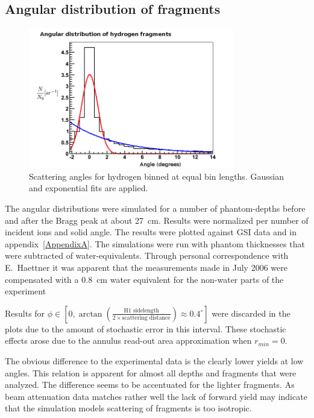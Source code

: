 \subsection{Angular distribution of fragments}
\begin{figure}[!h] 
\begin{center}
\includegraphics[width=0.8\textwidth]{images/plots/angularDistributions/equlBinnedHydrogen279.png}  
\caption{\label{fig:binnedHydrogen} Scattering angles for hydrogen binned at equal bin lengths. Gaussian and exponential fits are applied.}
 \end{center}
 \end{figure}
The angular distributions were simulated for a number of phantom-depths before and after the Bragg peak at about 27~cm. Results were normalized per number of incident ions and solid angle. The results were plotted against GSI data and in appendix~\ref{AppendixA}. The simulations were run with phantom thicknesses that were subtracted of water-equivalents. Through personal correspondence with E.~Haettner it was apparent that the measurements made in July 2006 were compensated with a $0.8$~cm water equivalent for the non-water parts of the experiment

Results for $\phi \in [0,\arctan(\frac{\text{H1 sidelength}}{2 \times \text{scattering distance}}) \approx 0.4^{\circ}]$ were discarded in the plots due to the amount of stochastic error in this interval. These stochastic effects arose due to the annulus read-out area approximation when $r_{min} = 0$.

The obvious difference to the experimental data is the clearly lower yields at low angles. This relation is apparent for almost all depths and fragments that were analyzed. The difference seems to be accentuated for the lighter fragments. As beam attenuation data matches rather well the lack of forward yield may indicate that the simulation models scattering of fragments is too isotropic.

